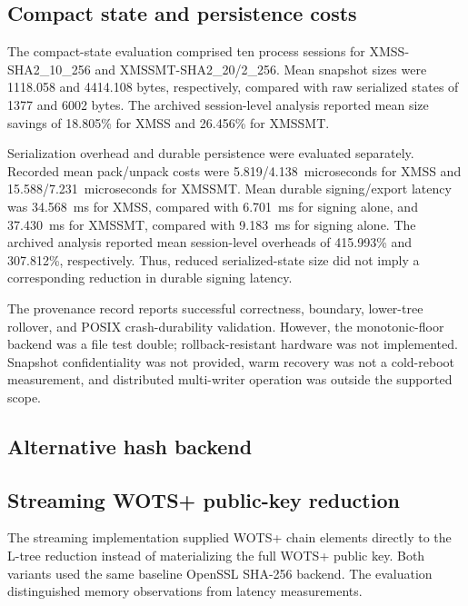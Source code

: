 \documentclass[pdflatex,sn-mathphys-num]{sn-jnl}
\begin{document}
\subsection{Compact state and persistence costs}
\label{subsec:compact_state_review}

The compact-state evaluation comprised ten process sessions for
XMSS-SHA2\_10\_256 and XMSSMT-SHA2\_20/2\_256. Mean snapshot sizes were
1118.058 and 4414.108 bytes, respectively, compared with raw serialized
states of 1377 and 6002 bytes. The archived session-level analysis
reported mean size savings of 18.805\% for XMSS and 26.456\% for XMSSMT.

Serialization overhead and durable persistence were evaluated
separately. Recorded mean pack/unpack costs were
5.819/4.138~microseconds for XMSS and
15.588/7.231~microseconds for XMSSMT.
Mean durable signing/export latency was 34.568~ms for XMSS,
compared with 6.701~ms for signing alone, and
37.430~ms for XMSSMT, compared with 9.183~ms for signing alone.
The archived analysis reported mean session-level overheads of
415.993\% and 307.812\%, respectively. Thus, reduced serialized-state
size did not imply a corresponding reduction in durable signing latency.

The provenance record reports successful correctness, boundary,
lower-tree rollover, and POSIX crash-durability validation.
However, the monotonic-floor backend was a file test double;
rollback-resistant hardware was not implemented. Snapshot confidentiality
was not provided, warm recovery was not a cold-reboot measurement,
and distributed multi-writer operation was outside the supported scope.

\subsection{Alternative hash backend}


\label{subsec:hash_backend}

\subsection{Streaming WOTS+ public-key reduction}
\label{subsec:o5_streaming_review}

The streaming implementation supplied WOTS+ chain elements directly to
the L-tree reduction instead of materializing the full WOTS+ public key.
Both variants used the same baseline OpenSSL SHA-256 backend. The
evaluation distinguished memory observations from latency measurements.
\end{document}
